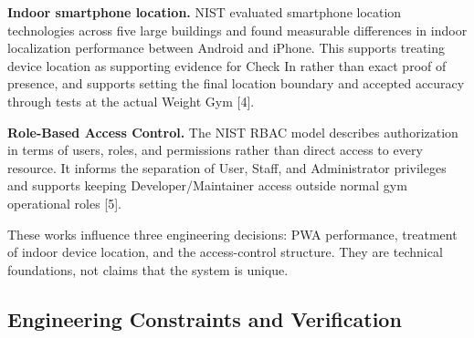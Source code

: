 \documentclass[11pt,letterpaper]{article}
\begin{document}
\textbf{Indoor smartphone location.} NIST evaluated smartphone location technologies across five large buildings and found measurable differences in indoor localization performance between Android and iPhone. This supports treating device location as supporting evidence for Check In rather than exact proof of presence, and supports setting the final location boundary and accepted accuracy through tests at the actual Weight Gym [4].

\textbf{Role-Based Access Control.} The NIST RBAC model describes authorization in terms of users, roles, and permissions rather than direct access to every resource. It informs the separation of User, Staff, and Administrator privileges and supports keeping Developer/Maintainer access outside normal gym operational roles [5].

These works influence three engineering decisions: PWA performance, treatment of indoor device location, and the access-control structure. They are technical foundations, not claims that the system is unique.

\subsection{Engineering Constraints and Verification}
\end{document}
